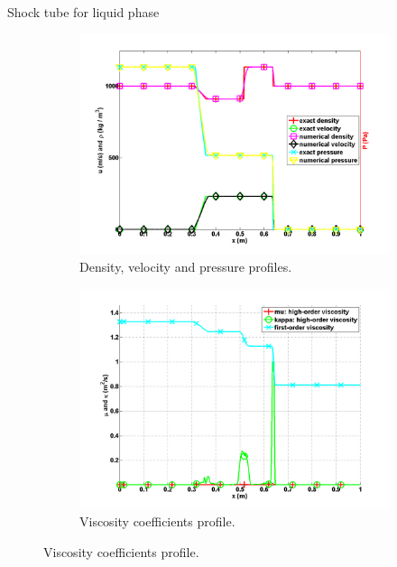 \documentclass[xcolor=dvipsnames,10pt]{beamer}
\begin{document}
\begin{frame}{Shock tube for liquid phase}
\begin{figure}[H]
        \centering
        \begin{subfigure}[b]{0.5\textwidth}
                \centering
                \includegraphics[width=\textwidth]{../figures/LiquidSrongShock_density_velocity_pressure_profiles.png}
                \caption{Density, velocity and pressure profiles.}
                \label{fig:1d_strong_shock_var}
        \end{subfigure}%
        \begin{subfigure}[b]{0.5\textwidth}
                \centering
                \includegraphics[width=\textwidth]{../figures/LiquidSrongShock_viscosity.png}
                \caption{Viscosity coefficients profile.}
                \label{fig:1d_strong_shock_visc}
        \end{subfigure}
\end{figure}
\end{frame}
\end{document}
